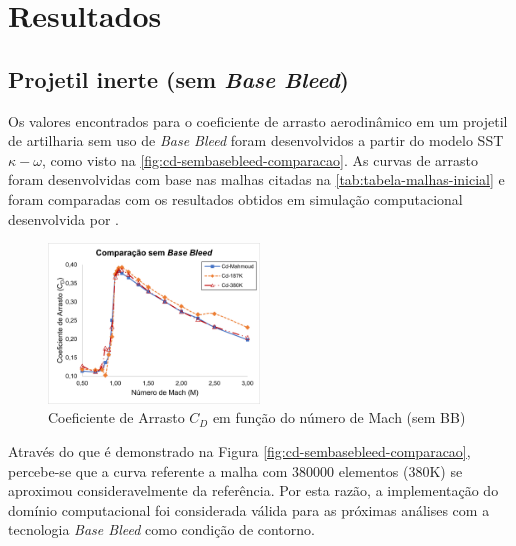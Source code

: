 \chapter{Resultados}\label{cap:resultados}
\graphicspath{{chapter-07/img-cap07/}}

\section{Projetil inerte (sem \textit{Base Bleed})}\label{sec:resultados-sem-basebleed}

Os valores encontrados para o coeficiente de arrasto aerodinâmico em um projetil de artilharia sem uso de \textit{Base Bleed} foram desenvolvidos a partir do modelo SST $\kappa-\omega$, como visto na \autoref{fig:cd-sembasebleed-comparacao}. As curvas de arrasto foram desenvolvidas com base nas malhas citadas na \autoref{tab:tabela-malhas-inicial} e foram comparadas com os resultados obtidos em simulação computacional desenvolvida por \citeauthor{Mahmoud2009}. 

\begin{figure}[!ht]
	\centering
	\includegraphics[width=0.5\textwidth]{cd-sembasebleed-comparacao.png}
	\caption{Coeficiente de Arrasto $C_{D}$ em função do número de Mach (sem BB)}
	\label{fig:cd-sembasebleed-comparacao}
\end{figure}

Através do que é demonstrado na Figura \autoref{fig:cd-sembasebleed-comparacao}, percebe-se que a curva referente a malha com \num{380000} elementos (380K) se aproximou consideravelmente da referência. Por esta razão, a implementação do domínio computacional foi considerada válida para as próximas análises com a tecnologia \textit{Base Bleed} como condição de contorno.

